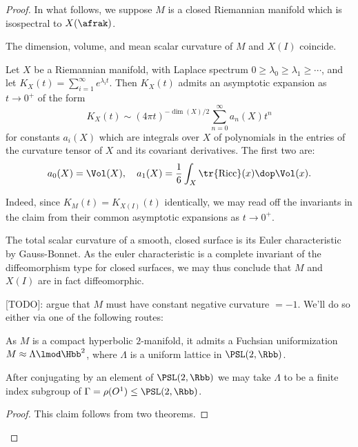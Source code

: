\begin{proof}
In what follows, we suppose $M$ is a closed Riemannian manifold which is isospectral to $X(\afrak)$.

\begin{claim}\label{claim:heat}
  The dimension, volume, and mean scalar curvature of $M$ and $X(I)$ coincide.
\end{claim}



\begin{lemma}
  Let $X$ be a Riemannian manifold, with Laplace spectrum $0\geq \lambda_0 \geq \lambda_1 \geq \cdots$, and let $K_X(t)=\sum_{i=1}^\infty e^{\lambda_i t}$. Then $K_X(t)$ admits an asymptotic expansion as $t\to 0^+$ of the form
  \[ K_X(t) \sim (4\pi t)^{-\dim(X)/2} \sum_{n=0}^\infty a_n(X) t^n \]
  for constants $a_i(X)$ which are integrals over $X$ of polynomials in the entries of the curvature tensor of $X$ and its covariant derivatives. The first two are:
  \[a_0(X) = \Vol(X),\quad a_1(X) = \frac{1}{6} \int_X \tr {\rm Ricc} (x) \dop \Vol(x).\]
\end{lemma}

Indeed, since $K_M(t) = K_{X(I)}(t)$ identically, we may read off the invariants in the claim from their common asymptotic expansions as $t\to 0^+$.
\begin{rem}
  The total scalar curvature of a smooth, closed surface is its Euler characteristic by Gauss-Bonnet. As the euler characteristic is a complete invariant of the diffeomorphism type for closed surfaces, we may thus conclude that $M$ and $X(I)$ are in fact diffeomorphic.
\end{rem}

[TODO]: argue that $M$ must have constant negative curvature $=-1$. We'll do so either via one of the following routes:


As $M$ is a compact hyperbolic $2$-manifold, it admits a Fuchsian uniformization $M \approx \Lambda \lmod \Hbb^2$, where $\Lambda$ is a uniform lattice in $\PSL(2,\Rbb)$.
\begin{claim}
  After conjugating by an element of $\PSL(2,\Rbb)$ we may take $\Lambda$ to be a finite index subgroup of $\Gamma = \rho(O^1) \leq  \PSL(2,\Rbb)$.
\end{claim}
\begin{proof}
This claim follows from two theorems.


\end{proof}
\end{proof}
